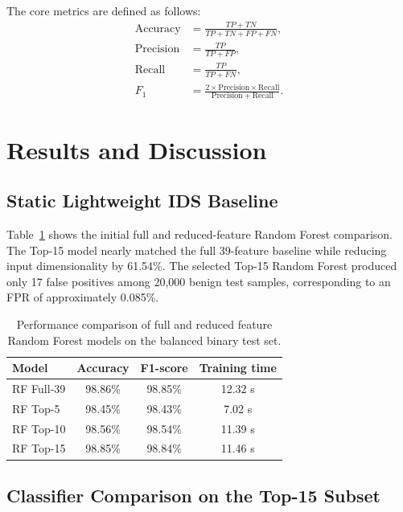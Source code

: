 \documentclass[11pt,a4paper]{article}
\begin{document}
The core metrics are defined as follows:
%
\begin{align}
\mathrm{Accuracy} &= \frac{TP + TN}{TP + TN + FP + FN}, \\
\mathrm{Precision} &= \frac{TP}{TP + FP}, \\
\mathrm{Recall} &= \frac{TP}{TP + FN}, \\
F_1 &= \frac{2 \times \mathrm{Precision} \times \mathrm{Recall}}
{\mathrm{Precision} + \mathrm{Recall}}.
\end{align}

\section{Results and Discussion}
\label{sec:results}

\subsection{Static Lightweight IDS Baseline}
\label{sec:static}

Table~\ref{tab:rf-feature} shows the initial full and reduced-feature
Random Forest comparison. The Top-15 model nearly matched the full
39-feature baseline while reducing input dimensionality by 61.54\%. The
selected Top-15 Random Forest produced only 17 false positives among
20{,}000 benign test samples, corresponding to an FPR of approximately
0.085\%.

\begin{table}[!ht]
\centering
\caption{Performance comparison of full and reduced feature Random
Forest models on the balanced binary test set.}
\label{tab:rf-feature}
\small
\begin{tabular}{lccc}
\toprule
\textbf{Model} & \textbf{Accuracy} & \textbf{F1-score} &
\textbf{Training time} \\
\midrule
RF Full-39 & 98.86\% & 98.85\% & 12.32 s \\
RF Top-5   & 98.45\% & 98.43\% & 7.02 s \\
RF Top-10  & 98.56\% & 98.54\% & 11.39 s \\
RF Top-15  & 98.85\% & 98.84\% & 11.46 s \\
\bottomrule
\end{tabular}
\end{table}

\subsection{Classifier Comparison on the Top-15 Subset}
\end{document}
